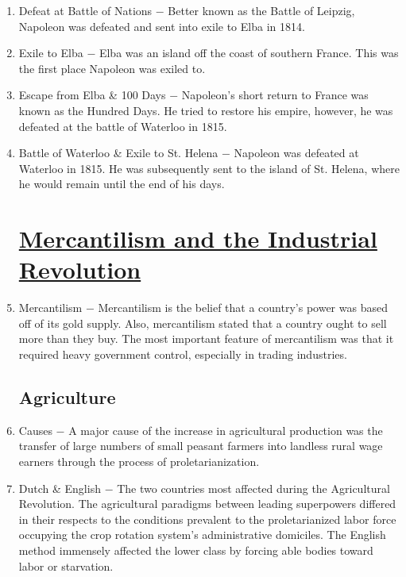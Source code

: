 \documentclass[12pt]{article}
\begin{document}
\begin{enumerate}
\begin{enumerate}[label=\arabic{*}.]
\end{enumerate}
\setcounter{enumi}{358}

\item Defeat at Battle of Nations $-$ Better known as the Battle of Leipzig, Napoleon was defeated and sent into exile to Elba in 1814.

\item Exile to Elba $-$ Elba was an island off the coast of southern France. This was the first place Napoleon was exiled to.

\item Escape from Elba \& 100 Days $-$ Napoleon's short return to France was known as the Hundred Days. He tried to restore his empire, however, he was defeated at the battle of Waterloo in 1815.

\item Battle of Waterloo \& Exile to St. Helena $-$ Napoleon was defeated at Waterloo in 1815. He was subsequently sent to the island of St. Helena, where he would remain until the end of his days.

\section[\underline{Mercantilism, Agricultural Revolution, \& Industrial Revolution}]{\underline{Mercantilism and the Industrial Revolution}}

\item Mercantilism $-$ Mercantilism is the belief that a country's power was based off of its gold supply. Also, mercantilism stated that a country ought to sell more than they buy. The most important feature of mercantilism was that it required heavy government control, especially in trading industries.


\subsection{Agriculture}

\item Causes $-$ A major cause of the increase in agricultural production was the transfer of large numbers of small peasant farmers into landless rural wage earners through the process of proletarianization. 

\item Dutch \& English $-$ The two countries most affected during the Agricultural Revolution. The agricultural paradigms between leading superpowers differed in their respects to the conditions prevalent to the proletarianized labor force occupying the crop rotation system's administrative domiciles. The English method immensely affected the lower class by forcing able bodies toward labor or starvation.
 

\end{enumerate}
\end{document}
